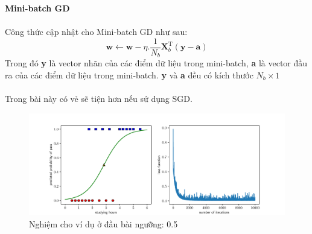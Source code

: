 \documentclass{article}
\begin{document}
\textbf{Mini-batch GD}\\\\
Công thức cập nhật cho Mini-batch GD như sau:
\begin{equation}
    \textbf{w} \leftarrow \textbf{w} - \eta. \frac{1}{N_b} \textbf{X}_{b}^{\text{T}}(\textbf{y}-\textbf{a})
    \label{eq23}
\end{equation}
Trong đó \textbf{y} là vector nhãn của các điểm dữ liệu trong mini-batch, \textbf{a} là vector đầu ra của các điểm dữ liệu trong mini-batch. \textbf{y} và \textbf{a} đều có kích thước $N_b\times1$\\\\
Trong bài này có vẻ sẽ tiện hơn nếu sử dụng SGD.
\begin{figure}[ht!]
    \centering
    \includegraphics[width = 0.9\linewidth]{logistic_1d.pdf}
    \caption{Nghiệm cho ví dụ ở đầu bài ngưỡng: 0.5}
    \label{fig15}
\end{figure}
\end{document}
